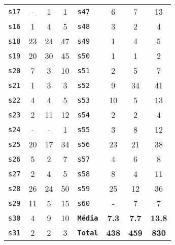 \begin{longtable}{ l c c c | l c c c }
\texttt{s17} & - & 1 & 1 & \texttt{s47} & 6 & 7 & 13 \\
\texttt{s16} & 1 & 4 & 5 & \texttt{s48} & 3 & 2 & 4 \\
\texttt{s18} & 23 & 24 & 47 & \texttt{s49} & 1 & 4 & 5 \\
\texttt{s19} & 20 & 30 & 45 & \texttt{s50} & 1 & 1 & 2 \\
\texttt{s20} & 7 & 3 & 10 & \texttt{s51} & 2 & 5 & 7 \\
\texttt{s21} & 1 & 3 & 3 & \texttt{s52} & 9 & 34 & 41 \\
\texttt{s22} & 4 & 4 & 5 & \texttt{s53} & 10 & 5 & 13 \\
\texttt{s23} & 2 & 11 & 12 & \texttt{s54} & 2 & 2 & 4 \\
\texttt{s24} & - & - & 1 & \texttt{s55} & 3 & 8 & 12 \\
\texttt{s25} & 20 & 17 & 34 & \texttt{s56} & 23 & 21 & 38 \\
\texttt{s26} & 5 & 2 & 7 & \texttt{s57} & 4 & 6 & 8 \\
\texttt{s27} & 2 & 4 & 5 & \texttt{s58} & 8 & 4 & 11 \\
\texttt{s28} & 26 & 24 & 50 & \texttt{s59} & 25 & 12 & 36 \\
\texttt{s29} & 11 & 5 & 15 & \texttt{s60} & - & 7 & 7 \\
\texttt{s30} & 4 & 9 & 10 & \texttt{{\bf Média}} & {\bf 7.3} & {\bf 7.7} & {\bf 13.8} \\
\texttt{s31} & 2 & 2 & 3 & \texttt{{\bf Total}} & {\bf 438} & {\bf 459} & {\bf 830} \\
\end{longtable}
